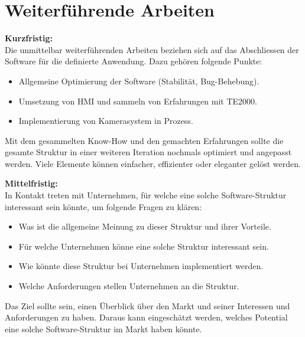 \section{Weiterführende Arbeiten} \label{Weiterführende_Arbeiten}

	\textbf{Kurzfristig:}
	\vspace{2mm}  
	\\
	Die unmittelbar weiterführenden Arbeiten beziehen sich auf das Abschliessen der Software für die definierte Anwendung. Dazu gehören folgende Punkte:
	
	\begin{itemize}
		\item Allgemeine Optimierung der Software (Stabilität, Bug-Behebung).
		\item Umsetzung von HMI und sammeln von Erfahrungen mit TE2000.
		\item Implementierung von Kamerasystem in Prozess.
	\end{itemize}
	\vspace{3mm}  

	Mit dem gesammelten Know-How und den gemachten Erfahrungen sollte die gesamte Struktur in einer weiteren Iteration nochmals optimiert und angepasst werden. Viele Elemente können einfacher, effizienter oder eleganter gelöst werden. 
	
	\vspace{3mm}  
	
	\textbf{Mittelfristig:}
	\vspace{2mm}  
	\\
	In Kontakt treten mit Unternehmen, für welche eine solche Software-Struktur interessant sein könnte, um folgende Fragen zu klären: 
	
	\begin{itemize}
		\item Was ist die allgemeine Meinung zu dieser Struktur und ihrer Vorteile.
		\item Für welche Unternehmen könne eine solche Struktur interessant sein.
		\item Wie könnte diese Struktur bei Unternehmen implementiert werden.
		\item Welche Anforderungen stellen Unternehmen an die Struktur.
	\end{itemize}
	\vspace{3mm}  

	Das Ziel sollte sein, einen Überblick über den Markt und seiner Interessen und Anforderungen zu haben. Daraus kann eingeschätzt werden, welches Potential eine solche Software-Struktur im Markt haben könnte. 
	
